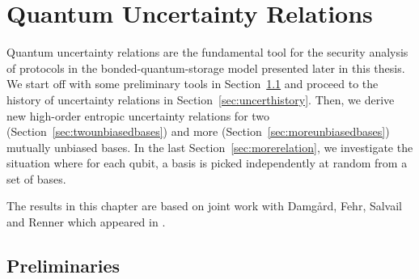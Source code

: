 \clearemptydoublepage
\chapter{Quantum Uncertainty Relations} \label{chap:uncertrelations} 
Quantum uncertainty relations are the
fundamental tool for the security analysis of protocols in the
bonded-quantum-storage model
presented later in this thesis. We start off with some preliminary
tools in Section~\ref{uncert:sec:prelim} and proceed to the history of
uncertainty relations in Section~\ref{sec:uncerthistory}. Then, we
derive new high-order entropic uncertainty relations for two
(Section~\ref{sec:twounbiasedbases}) and more
(Section~\ref{sec:moreunbiasedbases}) mutually unbiased bases. In the
last Section~\ref{sec:morerelation}, we investigate the situation
where for each qubit, a basis is picked independently at random from a
set of bases.

The results in this chapter are based on joint work with Damg{\aa}rd,
Fehr, Salvail and Renner which appeared in \cite{DFSS08journal,DFRSS07}.


\section{Preliminaries} \label{uncert:sec:prelim}
